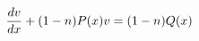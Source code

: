 \documentclass[preview]{standalone}
\begin{document}
\begin{align*}
\special{dvisvgm:raw <g id='unique000'>}\frac{dv}{dx} + (1 - n)P(x)v = (1 - n)Q(x)\special{dvisvgm:raw </g>}
\end{align*}
\end{document}

